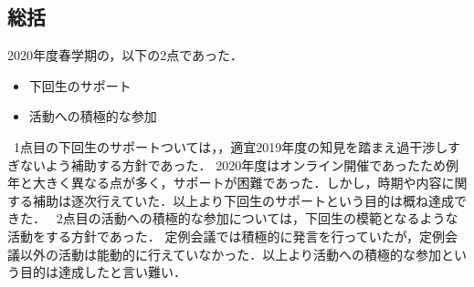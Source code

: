 \subsection*{\thirdGrade{}総括}


2020年度春学期の，以下の2点であった．
\begin{itemize}
\item 下回生のサポート
\item 活動への積極的な参加
\end{itemize}
\  1点目の下回生のサポートついては，，適宜2019年度の知見を踏まえ過干渉しすぎないよう補助する方針であった．
2020年度はオンライン開催であったため例年と大きく異なる点が多く，サポートが困難であった．しかし，時期や内容に関する補助は逐次行えていた．以上より下回生のサポートという目的は概ね達成できた．
\  2点目の活動への積極的な参加については，下回生の模範となるような活動をする方針であった．
定例会議では積極的に発言を行っていたが，定例会議以外の活動は能動的に行えていなかった．以上より活動への積極的な参加という目的は達成したと言い難い．
